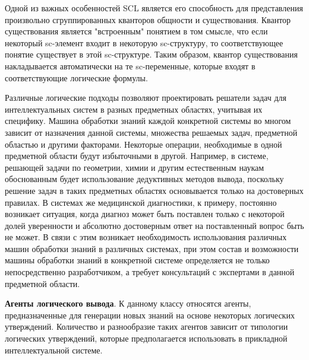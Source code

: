 Одной из важных особенностей SCL является его способность для представления произвольно сгруппированных кванторов общности и существования. Квантор существования является "встроенным" понятием в том смысле, что если некоторый sc-элемент входит в некоторую sc-структуру, то соответствующее понятие существует в этой sc-структуре. Таким образом, квантор существования накладывается автоматически на те sc-переменные, которые входят в соответствующие логические формулы.


Различные логические подходы позволяют проектировать решатели задач для интеллектуальных систем в разных предметных областях, учитывая их специфику.
Машина обработки знаний каждой конкретной системы во многом зависит от назначения данной системы, множества решаемых задач, предметной областью и другими факторами. Некоторые операции, необходимые в одной предметной области будут избыточными в другой. Например, в системе, решающей задачи по геометрии, химии и другим естественным наукам обоснованным будет использование дедуктивных методов вывода, поскольку решение задач в таких предметных областях основывается только на достоверных правилах. В системах же медицинской диагностики, к примеру, постоянно возникает ситуация, когда диагноз может быть поставлен только с некоторой долей уверенности и абсолютно достоверным ответ на поставленный вопрос быть не может. В связи с этим возникает необходимость использования различных машин обработки знаний в различных системах, при этом состав и возможности машины обработки знаний в конкретной системе определяется не только непосредственно разработчиком, а требует консультаций с экспертами в данной предметной области.

\textbf{Агенты логического вывода}. К данному классу относятся агенты, предназначенные для генерации новых знаний на основе некоторых логических утверждений. Количество и разнообразие таких агентов зависит от типологии логических утверждений, которые предполагается использовать в прикладной интеллектуальной системе.

